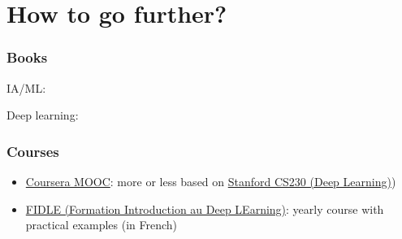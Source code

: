 \section{How to go further?}

\begin{frame}
  \frametitle{Books}

  \nocite{*}

  IA/ML:
  \printbibliography[category=general]

  Deep learning:
  \printbibliography[category=deep_learning]
\end{frame}

\begin{frame}
  \frametitle{Courses}

  \begin{itemize}
  \item
    \href{https://www.coursera.org/specializations/machine-learning-introduction}{Coursera
    MOOC}:
    more or less based on \href{https://cs230.stanford.edu/}{Stanford CS230 (Deep Learning)})
  \item \href{https://fidle.cnrs.fr/}{FIDLE (Formation Introduction au Deep LEarning)}: yearly course with practical examples (in French)
  \end{itemize}
\end{frame}
